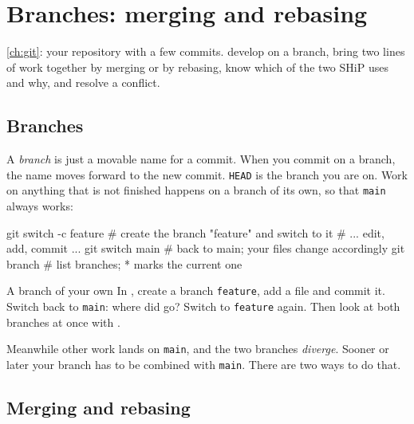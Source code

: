 \chapter{Branches: merging and rebasing}
\label{ch:branches}

{\cref{ch:git}: your  repository with a few commits.}
{develop on a branch, bring two lines of work together by merging or by
rebasing, know which of the two SHiP uses and why, and resolve a conflict.}

\section{Branches}

A \emph{branch} is just a movable name for a commit. When you commit on a
branch, the name moves forward to the new commit. \texttt{HEAD} is the branch
you are on. Work on anything that is not finished happens on a branch of its
own, so that \texttt{main} always works:

\begin{shell}
git switch -c feature          # create the branch "feature" and switch to it
# ... edit, add, commit ...
git switch main                # back to main; your files change accordingly
git branch                     # list branches; * marks the current one
\end{shell}

\begin{exercise}{A branch of your own}
In , create a branch \texttt{feature}, add a file
 and commit it. Switch back to \texttt{main}: where did
 go? Switch to \texttt{feature} again. Then look at both
branches at once with .
\end{exercise}

Meanwhile other work lands on \texttt{main}, and the two branches
\emph{diverge}. Sooner or later your branch has to be combined with
\texttt{main}. There are two ways to do that.

\section{Merging and rebasing}
\label{sec:mergerebase}

